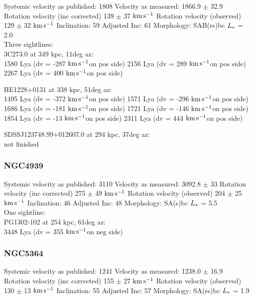 \documentclass[iop]{emulateapj-rtx4}
\newcommand{\kms}{$\rm km\, s^{-1}$}
\begin{document}


Systemic velocity as published: 1808
Velocity as measured: 1866.9 $\pm$ 32.9
Rotation velocity (inc corrected) 139 $\pm$ 37 \kms
Rotation velocity (observed) 129 $\pm$ 32 \kms
Inclination: 59
Adjusted Inc: 61
Morphology: SAB(rs)bc
$L_{\**}$ = 2.0 \\

Three sightlines: \\
3C273.0 at 349 kpc, 11deg az: \\
1580 Lya (dv = -287 \kms on pos side)
2156 Lya (dv = 289 \kms on pos side)
2267 Lya (dv = 400 \kms on pos side)


HE1228+0131 at 338 kpc, 51deg az: \\
1495 Lya (dv = -372 \kms on pos side)
1571 Lya (dv = -296 \kms on pos side)
1686 Lya (dv = -181 \kms on pos side)
1721 Lya (dv = -146 \kms on pos side)
1854 Lya (dv = -13 \kms on pos side)
2311 Lya (dv = 444 \kms on pos side)

SDSSJ123748.99+012607.0 at  294 kpc, 37deg az: \\
not finished


\subsubsection{NGC4939}
Systemic velocity as published: 3110
Velocity as measured: 3092.8 $\pm$ 33
Rotation velocity (inc corrected) 275 $\pm$ 49 \kms
Rotation velocity (observed) 204 $\pm$ 25 \kms
Inclination: 46
Adjusted Inc: 48
Morphology: SA(s)bc
$L_{\**}$ = 5.5 \\

One sightline: \\
PG1302-102 at 254 kpc, 61deg az: \\
3448 Lya (dv = 355 \kms on neg side)



\subsubsection{NGC5364}
Systemic velocity as published: 1241
Velocity as measured: 1238.0 $\pm$ 16.9
Rotation velocity (inc corrected) 155 $\pm$ 27 \kms
Rotation velocity (observed) 130 $\pm$ 13 \kms
Inclination: 55
Adjusted Inc: 57
Morphology: SA(rs)bc
$L_{\**}$ = 1.9 \\
\end{document}
